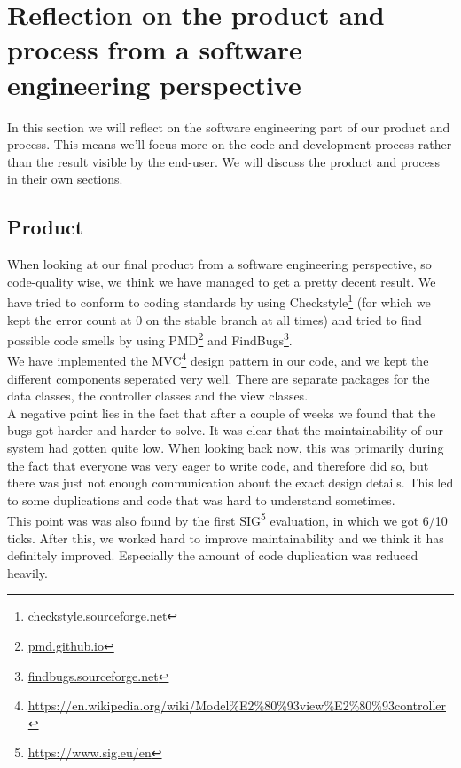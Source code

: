 \section{Reflection on the product and process from a software engineering perspective}

In this section we will reflect on the software engineering part of our product and process. This means we'll focus more on the code and development process rather than the result visible by the end-user. We will discuss the product and process in their own sections.

\subsection{Product}
When looking at our final product from a software engineering perspective, so code-quality wise, we think we have managed to get a pretty decent result. We have tried to conform to coding standards by using Checkstyle\footnote{\url{checkstyle.sourceforge.net}} (for which we kept the error count at 0 on the stable branch at all times) and tried to find possible code smells by using PMD\footnote{\url{pmd.github.io}} and FindBugs\footnote{\url{findbugs.sourceforge.net}}.\\
We have implemented the MVC\footnote{\url{https://en.wikipedia.org/wiki/Model\%E2\%80\%93view\%E2\%80\%93controller}} design pattern in our code, and we kept the different components seperated very well. There are separate packages for the data classes, the controller classes and the view classes.\\
A negative point lies in the fact that after a couple of weeks we found that the bugs got harder and harder to solve. It was clear that the maintainability of our system had gotten quite low. When looking back now, this was primarily during the fact that everyone was very eager to write code, and therefore did so, but there was just not enough communication about the exact design details. This led to some duplications and code that was hard to understand sometimes.\\
This point was was also found by the first SIG\footnote{\url{https://www.sig.eu/en}} evaluation, in which we got 6/10 ticks. After this, we worked hard to improve maintainability and we think it has definitely improved. Especially the amount of code duplication was reduced heavily.\\


